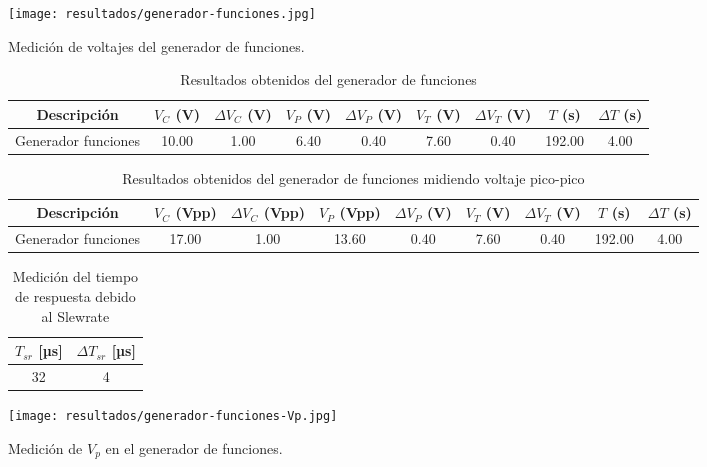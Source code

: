 \FloatBarrier

\begin{ilustracion}[ht]
    \centering
    \texttt{[image: resultados/generador-funciones.jpg]}
    \caption{Medición de voltajes del generador de funciones.}
    \label{ilus:generador-funciones}
\end{ilustracion}

\begin{table}[ht]
\centering
\begin{tabular}{|c|c|c|c|c|c|c|c|c|}
\hline
Descripción & $V_C$ (V) & $\Delta V_C$ (V) & $V_P$ (V) & $\Delta V_P$ (V) & $V_T$ (V) & $\Delta V_T$ (V) & $T$ (s) & $\Delta T$ (s) \\ \hline
Generador funciones & 10.00 & 1.00 & 6.40 & 0.40 & 7.60 & 0.40 & 192.00 & 4.00 \\ \hline
\end{tabular}
\caption{Resultados obtenidos del generador de funciones}
\label{tab:resultados-generador-funciones}
\end{table}

\begin{table}[ht]
\centering
\begin{tabular}{|c|c|c|c|c|c|c|c|c|}
\hline
Descripción & $V_C$ (Vpp) & $\Delta V_C$ (Vpp) & $V_P$ (Vpp) & $\Delta V_P$ (V) & $V_T$ (V) & $\Delta V_T$ (V) & $T$ (s) & $\Delta T$ (s) \\ \hline
Generador funciones & 17.00 & 1.00 & 13.60 & 0.40 & 7.60 & 0.40 & 192.00 & 4.00 \\ \hline
\end{tabular}
\caption{Resultados obtenidos del generador de funciones midiendo voltaje pico-pico}
\label{tab:resultados-generador-funciones-vpp}
\end{table}

\begin{table}[ht]
\centering
\begin{tabular}{|c|c|}
\hline
$T_{sr}$ [µs] & $\Delta T_{sr}$ [µs] \\ \hline
32 & 4 \\ \hline
\end{tabular}
\caption{Medición del tiempo de respuesta debido al Slewrate}
\label{tab:tiempo-subida}
\end{table}

\begin{ilustracion}
    \centering
    \texttt{[image: resultados/generador-funciones-Vp.jpg]}
    \caption{Medición de $V_p$ en el generador de funciones.}
    \label{ilus:generador-funciones-Vp}
\end{ilustracion}
